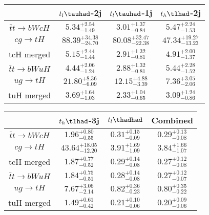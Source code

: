 \centering
\begin{tabular}{|c|c|c|c|} \hline
 & $t_l\tauhad$-2j & $t_l\tauhad$-1j & $t_h\tlhad$-2j\\\hline
$\bar{t}t\to bWcH$ & $5.34^{+2.54}_{-1.49}$ & $3.01^{+1.37}_{-0.84}$ & $5.47^{+2.24}_{-1.53}$\\\hline
$cg\to tH$ & $88.39^{+34.38}_{-24.70}$ & $80.08^{+32.47}_{-22.38}$ & $47.34^{+19.27}_{-13.23}$\\\hline
tcH merged & $5.15^{+2.44}_{-1.44}$ & $2.91^{+1.32}_{-0.81}$ & $4.91^{+2.00}_{-1.37}$\\\hline
$\bar{t}t\to bWuH$ & $4.44^{+2.06}_{-1.24}$ & $2.88^{+1.32}_{-0.81}$ & $5.44^{+2.28}_{-1.52}$\\\hline
$ug\to tH$ & $21.80^{+8.36}_{-6.09}$ & $12.15^{+4.88}_{-3.39}$ & $7.36^{+3.05}_{-2.06}$\\\hline
tuH merged & $3.69^{+1.64}_{-1.03}$ & $2.33^{+1.04}_{-0.65}$ & $3.09^{+1.24}_{-0.86}$\\\hline
\end{tabular}
\begin{tabular}{|c|c|c|c|} \hline
 & $t_h\tlhad$-3j & $t_l\thadhad$ & Combined\\\hline
$\bar{t}t\to bWcH$ & $1.96^{+0.80}_{-0.55}$ & $0.31^{+0.15}_{-0.09}$ & $0.29^{+0.13}_{-0.08}$\\\hline
$cg\to tH$ & $43.64^{+18.05}_{-12.20}$ & $3.91^{+1.69}_{-1.09}$ & $3.84^{+1.66}_{-1.07}$\\\hline
tcH merged & $1.87^{+0.77}_{-0.52}$ & $0.29^{+0.14}_{-0.08}$ & $0.27^{+0.12}_{-0.08}$\\\hline
$\bar{t}t\to bWuH$ & $1.84^{+0.75}_{-0.51}$ & $0.28^{+0.14}_{-0.08}$ & $0.27^{+0.12}_{-0.07}$\\\hline
$ug\to tH$ & $7.67^{+3.06}_{-2.14}$ & $0.82^{+0.36}_{-0.23}$ & $0.80^{+0.35}_{-0.22}$\\\hline
tuH merged & $1.49^{+0.61}_{-0.42}$ & $0.21^{+0.10}_{-0.06}$ & $0.20^{+0.09}_{-0.06}$\\\hline
\end{tabular}
